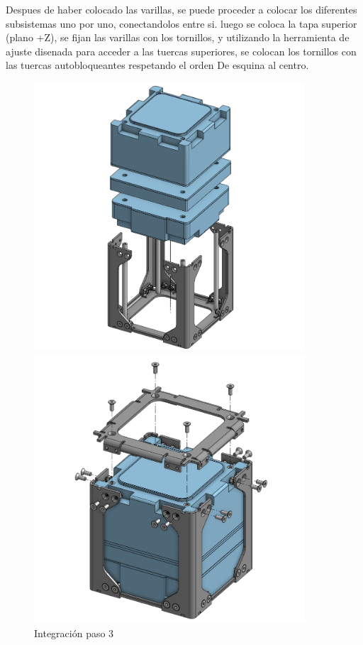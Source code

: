       Despues de haber colocado las varillas, se puede
      proceder a colocar los diferentes subsistemas uno por uno, conectandolos entre si. luego
      se coloca la tapa superior (plano +Z), se fijan las varillas con los tornillos, y utilizando la
      herramienta de ajuste disenada para acceder a las tuercas superiores, se colocan los tornillos
      con las tuercas autobloqueantes respetando el orden De esquina al centro.

      \begin{figure}[H]
        \begin{minipage}{0.49\textwidth}
          \centering
          \includegraphics[width=0.9\textwidth]{image/structure/integracion3.png}
          \caption{Integración paso 3}
          \label{fig:integracion3}
        \end{minipage}
        \begin{minipage}{0.49\textwidth}
          \centering
          \includegraphics[width=0.9\textwidth]{image/structure/integracion4.png}

\end{minipage}
\end{figure}

